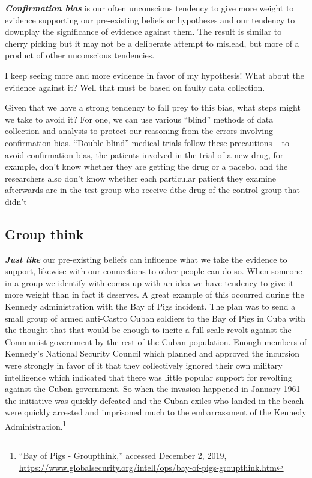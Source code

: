 \documentclass[
  12pt, openany]{book}
\theoremstyle{definition}
\theoremstyle{definition}
\theoremstyle{definition}
\theoremstyle{definition}
\theoremstyle{remark}
\begin{document}
\textbf{\emph{Confirmation bias}} is our often unconscious tendency to give more weight to evidence supporting our pre-existing beliefs or hypotheses and our tendency to downplay the significance of evidence against them. The result is similar to cherry picking but it may not be a deliberate attempt to mislead, but more of a product of other unconscious tendencies.

\begin{center}

\begin{argument}
I keep seeing more and more evidence in favor of my hypothesis! What about the evidence against it? Well that must be based on faulty data collection.

\end{argument}


\end{center}

Given that we have a strong tendency to fall prey to this bias, what steps might we take to avoid it? For one, we can use various ``blind'' methods of data collection and analysis to protect our reasoning from the errors involving confirmation bias. ``Double blind'' medical trials follow these precautions -- to avoid confirmation bias, the patients involved in the trial of a new drug, for example, don't know whether they are getting the drug or a pacebo, and the researchers also don't know whether each particular patient they examine afterwards are in the test group who receive dthe drug of the control group that didn't

\hypertarget{group-think}{%
\subsection*{Group think}\label{group-think}}


\textbf{\emph{Just like}} our pre-existing beliefs can influence what we take the evidence to support, likewise with our connections to other people can do so. When someone in a group we identify with comes up with an idea we have tendency to give it more weight than in fact it deserves. A great example of this occurred during the Kennedy administration with the Bay of Pigs incident. The plan was to send a small group of armed anti-Castro Cuban soldiers to the Bay of Pigs in Cuba with the thought that that would be enough to incite a full-scale revolt against the Communist government by the rest of the Cuban population. Enough members of Kennedy's National Security Council which planned and approved the incursion were strongly in favor of it that they collectively ignored their own military intelligence which indicated that there was little popular support for revolting against the Cuban government. So when the invasion happened in January 1961 the initiative was quickly defeated and the Cuban exiles who landed in the beach were quickly arrested and imprisoned much to the embarrassment of the Kennedy Administration.\footnote{``Bay of Pigs - Groupthink,'' accessed December 2, 2019, \url{https://www.globalsecurity.org/intell/ops/bay-of-pigs-groupthink.htm}}
\end{document}

